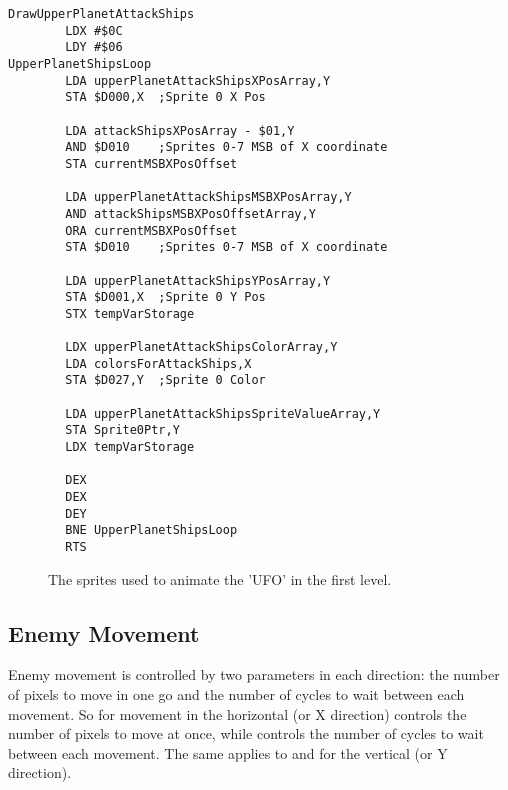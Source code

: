 \begin{lstlisting}
DrawUpperPlanetAttackShips
        LDX #$0C
        LDY #$06
UpperPlanetShipsLoop   
        LDA upperPlanetAttackShipsXPosArray,Y
        STA $D000,X  ;Sprite 0 X Pos

        LDA attackShipsXPosArray - $01,Y
        AND $D010    ;Sprites 0-7 MSB of X coordinate
        STA currentMSBXPosOffset

        LDA upperPlanetAttackShipsMSBXPosArray,Y
        AND attackShipsMSBXPosOffsetArray,Y
        ORA currentMSBXPosOffset
        STA $D010    ;Sprites 0-7 MSB of X coordinate

        LDA upperPlanetAttackShipsYPosArray,Y
        STA $D001,X  ;Sprite 0 Y Pos
        STX tempVarStorage

        LDX upperPlanetAttackShipsColorArray,Y
        LDA colorsForAttackShips,X
        STA $D027,Y  ;Sprite 0 Color

        LDA upperPlanetAttackShipsSpriteValueArray,Y
        STA Sprite0Ptr,Y
        LDX tempVarStorage

        DEX
        DEX
        DEY
        BNE UpperPlanetShipsLoop
        RTS
\end{lstlisting}

\begin{figure}[H]
  {
    \setlength{\tabcolsep}{3.0pt}
    \setlength\cmidrulewidth{\heavyrulewidth} %
	\centering
	\def\MULTICOLORONE{green}
	\def\MULTICOLORTWO{red}
	\def\SPRITECOLOR{blue}
	\begin{subfigure}{0.3\textwidth}
		
	\end{subfigure}
	\begin{subfigure}{0.3\textwidth}
		
	\end{subfigure}
	\begin{subfigure}{0.3\textwidth}
		
	\end{subfigure}
  }\caption[position=top]{The sprites used to animate the 'UFO' in the first level.}
\end{figure}

\subsection{Enemy Movement}

Enemy movement is controlled by two parameters in each direction: the number of pixels to move in one go and the number of
cycles to wait between each movement. So for movement in the horizontal (or X direction)  controls the number
of pixels to move at once, while  controls the number of cycles to wait between each movement. The same
applies to  and  for the vertical (or Y direction).

